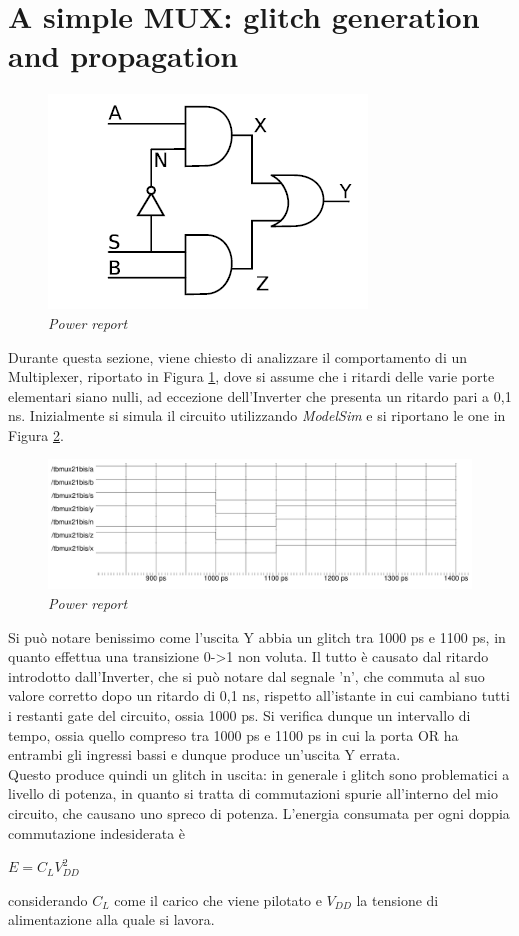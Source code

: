 \section{A simple MUX: glitch generation and propagation}
\begin{figure}[!htb]
	\centering
	\includegraphics[scale=0.8]{immagini/mux}
	\caption{\textit{Power report}}
	\label{mux}
\end{figure}
\noindent Durante questa sezione, viene chiesto di analizzare il comportamento di un Multiplexer, riportato in Figura \ref{mux}, dove si assume che i ritardi delle varie porte elementari siano nulli, ad eccezione dell'Inverter che presenta un ritardo pari a 0,1 ns. Inizialmente si simula il circuito utilizzando \textit{ModelSim} e si riportano le one in Figura \ref{model_mux}.
\begin{figure}[!htb]
	\centering
	\includegraphics[scale=0.25]{immagini/model_mux}
	\caption{\textit{Power report}}
	\label{model_mux}
\end{figure}
Si può notare benissimo come l'uscita Y abbia un glitch tra 1000 ps e 1100 ps, in quanto effettua una transizione 0->1 non voluta. Il tutto è causato dal ritardo introdotto dall'Inverter, che si può notare dal segnale 'n', che commuta al suo valore corretto dopo un ritardo di 0,1 ns, rispetto all'istante in cui cambiano tutti i restanti gate del circuito, ossia 1000 ps. Si verifica dunque un intervallo di tempo, ossia quello compreso tra 1000 ps e 1100 ps in cui la porta OR ha entrambi gli ingressi bassi e dunque produce un'uscita Y errata. \\
Questo produce quindi un glitch in uscita: in generale i glitch sono problematici a livello di potenza, in quanto si tratta di commutazioni spurie all'interno del mio circuito, che causano uno spreco di potenza. L'energia consumata per ogni doppia commutazione indesiderata è
\begin{center}
	$ E=C_{L}V_{DD}^{2}$
\end{center}
considerando $C_{L}$ come il carico che viene pilotato e $V_{DD}$ la tensione di alimentazione alla quale si lavora. 


